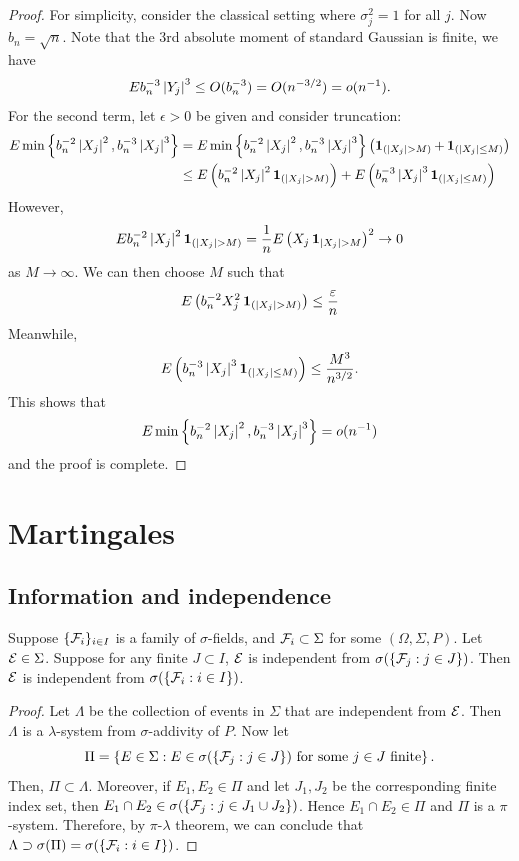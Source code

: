\documentclass[a4paper]{article}
\begin{document}
\begin{proof}
  For simplicity, consider the classical setting where $\sigma_j^2 = 1$
  for all $j$. Now $b_n = \sqrt{n}$. Note that the 3rd absolute moment
  of standard Gaussian is finite, we have
  \[
    E
    b_n^{-3} \left\lvert Y_j\right\rvert^3
    \leq O(b_n^{-3}) = O(n^{-3/2}) = o(n^{-1}).
  \]
  For the second term, let $\epsilon > 0$ be given and consider truncation:
  \begin{align*}
    E \min \left\{ b_n^{-2} \left\lvert X_j\right\rvert^2, b_n^{-3} \left\lvert X_j\right\rvert^{3} \right\}
     & = E \min \left\{ b_n^{-2} \left\lvert X_j\right\rvert^2, b_n^{-3} \left\lvert X_j\right\rvert^{3} \right\}
    \left( \operatorname{\mathbf{1}}_{(\left\lvert X_j\right\rvert > M)} + \operatorname{\mathbf{1}}_{(\left\lvert X_j\right\rvert \leq M)} \right)         \\
     & \leq E \left( b_n^{-2} \left\lvert X_j\right\rvert^2 \operatorname{\mathbf{1}}_{(\left\lvert X_j\right\rvert > M)} \right)
    + E \left( b_n^{-3} \left\lvert X_j\right\rvert^3 \operatorname{\mathbf{1}}_{(\left\lvert X_j\right\rvert \leq M)} \right)
  \end{align*}
  However,
  \[
    E b_n^{-2} \left\lvert X_j\right\rvert^2 \operatorname{\mathbf{1}}_{(\left\lvert X_j\right\rvert > M)}
    = \frac{1}{n} E \left( X_j \operatorname{\mathbf{1}}_{\left\lvert X_j\right\rvert > M} \right)^2 \to 0
  \]
  as $M \to \infty$. We can then choose $M$ such that
  \[
    E \left( b_n^{-2} X_j^2 \operatorname{\mathbf{1}}_{(\left\lvert X_j\right\rvert > M)} \right) \leq \frac{\varepsilon}{n}
  \]
  Meanwhile,
  \[
    E \left( b_n^{-3} \left\lvert X_j\right\rvert^3 \operatorname{\mathbf{1}}_{(\left\lvert X_j\right\rvert \leq M)} \right)
    \leq \frac{M^3}{n^{3/2}}.
  \]
  This shows that
  \[
    E \min \left\{ b_n^{-2} \left\lvert X_j\right\rvert^2, b_n^{-3} \left\lvert X_j\right\rvert^{3} \right\}
    = o(n^{-1})
  \]
  and the proof is complete.
\end{proof}

\section{Martingales}

\subsection{Information and independence}

\begin{prop}
  Suppose $\{\mathcal{F}_i\}_{i \in I}$ is a family of $\sigma$-fields,
  and $\mathcal{F}_i \subset \Sigma$ for some $(\Omega, \Sigma, P)$.
  Let $\mathcal{E} \in \Sigma$. Suppose
  for any finite $J \subset I$, $\mathcal{E}$ is independent from
  $\sigma (\{\mathcal{F}_j : j \in J\})$. Then $\mathcal{E}$ is independent from
  $\sigma (\{\mathcal{F}_i: i \in I\})$.
\end{prop}

\begin{proof}
  Let $\Lambda$ be the collection of events in $\Sigma$ that are independent
  from $\mathcal{E}$. Then $\Lambda$ is a $\lambda$-system from $\sigma$-addivity
  of $P$. Now let
  \[
    \Pi = \left\{ E \in \Sigma : E \in \sigma (\{ \mathcal{F}_j : j \in J \})
    \text{ for some $j \in J$ finite} \right\}.
  \]
  Then, $\Pi \subset \Lambda$. Moreover, if $E_1, E_2 \in \Pi$
  and let $J_1, J_2$ be the corresponding finite index set, then
  $E_1 \cap E_2 \in \sigma (\{ \mathcal{F}_j : j \in J_1 \cup J_2 \})$.
  Hence $E_1 \cap E_2 \in \Pi$ and $\Pi$ is a $\pi$-system.
  Therefore, by $\pi$-$\lambda$ theorem, we can conclude that
  $\Lambda \supset \sigma (\Pi) = \sigma (\{ \mathcal{F}_i : i \in I \})$.

\end{proof}
\end{document}
